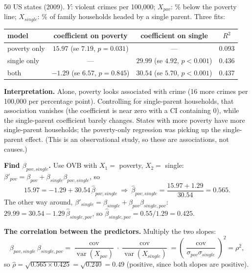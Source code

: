 \documentclass[11pt]{article}
\newcommand{\Var}{\operatorname{var}}
\newcommand{\Cov}{\operatorname{cov}}
\begin{document}
\begin{examplebox}[title={Question (10/14): poverty, single-parent households, and violent crime}]
50 US states (2009). $Y$: violent crimes per 100{,}000; $X_{pov}$: \% below the poverty line; $X_{single}$: \% of family households headed by a
single parent. Three fits:
\begin{center}
\begin{tabular}{lccc}
\toprule
model & coefficient on poverty & coefficient on single & $R^2$\\\midrule
poverty only & $15.97$ (se $7.19$, $p=0.031$) & --- & 0.093\\
single only & --- & $29.99$ (se $4.92$, $p<0.001$) & 0.436\\
both & $-1.29$ (se $6.57$, $p=0.845$) & $30.54$ (se $5.70$, $p<0.001$) & 0.437\\
\bottomrule
\end{tabular}
\end{center}
\textbf{Interpretation.} Alone, poverty looks associated with crime (16 more crimes per 100{,}000 per percentage point). Controlling for
single-parent households, that association vanishes (the coefficient is near zero with a CI containing 0), while the single-parent coefficient
barely changes. States with more poverty have more single-parent households; the poverty-only regression was picking up the single-parent effect.
(This is an observational study, so these are associations, not causes.)

\textbf{Find $\beta_{pov,single}$.} Use OVB with $X_1=$ poverty, $X_2=$ single: $\beta'_{pov}=\beta_{pov}+\beta_{single}\beta_{pov,single}$, so
\[
15.97=-1.29+30.54\,\hat\beta_{pov,single}\ \Longrightarrow\ \hat\beta_{pov,single}=\frac{15.97+1.29}{30.54}=0.565.
\]
The other way around, $\beta'_{single}=\beta_{single}+\beta_{pov}\beta_{single,pov}$: $29.99=30.54-1.29\,\hat\beta_{single,pov}$, so
$\hat\beta_{single,pov}=0.55/1.29=0.425$.

\textbf{The correlation between the predictors.} Multiply the two slopes:
\[
\beta_{pov,single}\,\beta_{single,pov}=\frac{\Cov}{\Var(X_{pov})}\cdot\frac{\Cov}{\Var(X_{single})}=\left(\frac{\Cov}{\sigma_{pov}\sigma_{single}}\right)^2=\rho^2,
\]
so $\hat\rho=\sqrt{0.565\times0.425}=\sqrt{0.240}=0.49$ (positive, since both slopes are positive).
\end{examplebox}
\end{document}

